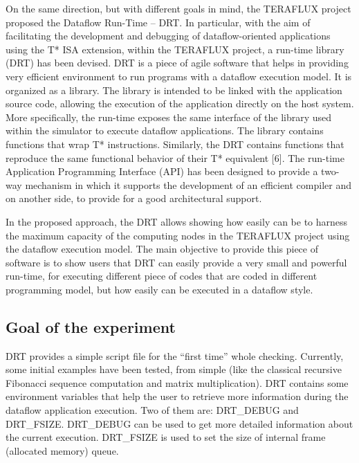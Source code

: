 \documentclass[a4paper]{article}
\begin{document}
{
On the same direction, but with different goals in mind, the TERAFLUX
project proposed the Dataflow Run-Time -- DRT. In particular,
{with the aim of
facilitating the development and debugging of dataflow-oriented
applications using the T* ISA extension, within the TERAFLUX project, a
run-time library (DRT) has been devised. DRT is a piece of agile
software that helps in providing very efficient environment to run
programs with a dataflow execution model. It is organized as a library.
The library is intended to be linked with the application source code,
allowing the execution of the application directly on the host system.
More specifically, the run-time exposes the same interface of the
library used within the simulator to execute dataflow applications. The
library contains functions that wrap T* instructions. Similarly, the
DRT contains functions that reproduce the same functional behavior of
their T* equivalent [6]. The run-time Application Programming Interface
(API) has been designed to provide a two-way mechanism in which it
supports the development of an efficient compiler and on another side,
to provide for a good architectural support.}}

{
{In the proposed
approach, the DRT allows showing how easily can be to harness the
maximum capacity of the computing nodes in the TERAFLUX project using
the dataflow execution model. The main objective to provide this piece
of software is to show users that DRT can easily provide a very small
and powerful run-time, for executing different piece of codes that are
coded in different programming model, but how easily can be executed in
a dataflow style. }}

\subsection[Goal of the experiment ]{Goal of the experiment }
{
{DRT provides a simple
script file for the {\textquotedblleft}first time{\textquotedblright}
whole checking. Currently, some initial examples have been tested, from
simple (like the classical recursive Fibonacci sequence computation and
matrix multiplication). DRT contains some environment variables that
help the user to retrieve more information during the dataflow
application execution. Two of them are: DRT\_DEBUG and DRT\_FSIZE.
DRT\_DEBUG can be used to get more detailed information about the
current execution. DRT\_FSIZE is used to set the size of internal frame
(allocated memory) queue.}}
\end{document}
